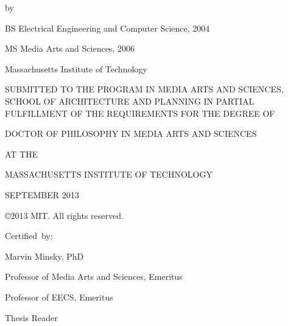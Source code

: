 \thispagestyle{empty}

\cleardoublepage

\begin{addmargin}[1cm]{-2cm}
\begin{center}
    \begingroup
        \color{Maroon}\spacedallcaps{\myTitle}
    \endgroup

    \vspace{2mm}

    by

    \vspace{2mm}

    \myName

    \vspace{6mm}
    
    BS Electrical Engineering and Computer Science, 2004
    
    MS Media Arts and Sciences, 2006

    Massachusetts Institute of Technology
    
    \vspace{6mm}

 SUBMITTED TO THE PROGRAM IN MEDIA ARTS AND SCIENCES, SCHOOL OF
 ARCHITECTURE AND PLANNING IN PARTIAL FULFILLMENT OF THE REQUIREMENTS
 FOR THE DEGREE OF

    \vspace{6mm}

DOCTOR OF PHILOSOPHY IN MEDIA ARTS AND SCIENCES

AT THE

MASSACHUSETTS INSTITUTE OF TECHNOLOGY

    \vspace{6mm}

SEPTEMBER 2013

    \vspace{6mm}

\copyright 2013 MIT.  All rights reserved.

\end{center}        


\begin{flushright}
  \vspace{15mm}

  Certified~by:\hspace{0.5cm}~\makebox[2.75in]{\hrulefill}
  
Marvin Minsky, PhD

Professor of Media Arts and Sciences, Emeritus

Professor of EECS, Emeritus

Thesis Reader

\end{flushright}

\end{addmargin}
